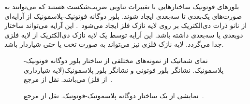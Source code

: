 بلورهای فوتونیک ساختارهایی با تغییرات تناوبی ضریب‌شکست هستند که می‌توانند به صورت‌های یک‌بعدی تا سه‌بعدی ایجاد شوند. بلور دوگانه فوتونیک-پلاسمونیک از آرایه‌ای از نانو ذرات دی‌الکتریک بر روی لایه نازک فلز ایجاد می‌شود~\cite{romanov2011}. این آرایه می‌تواند ساختار دوبعدی یا سه‌بعدی داشته باشد. این آرایه توسط یک لایه نازک دی‌الکتریک از لایه فلزی جدا می‌گردد. لایه نازک فلزی نیز می‌تواند به صورت تخت یا حتی شیاردار باشد.
\begin{figure}[tb]
	\caption{نمای شماتیک از نمونه‌های مختلفی از ساختار بلور دوگانه فوتونیک-پلاسمونیک.  نشانگر بلور فوتونی و  نشانگر بلور پلاسمونیک(لایه شیارداری از فلز) می‌باشد. نقل از مرجع~\cite{romanov2011}.}\label{fig:4}
\end{figure}
\begin{figure}[tb]
\caption{نمایشی از یک ساختار دوگانه پلاسمونیک-فوتونیک. نقل از مرجع~\cite{romanov2011}.}\label{fig4_1}
\end{figure}

